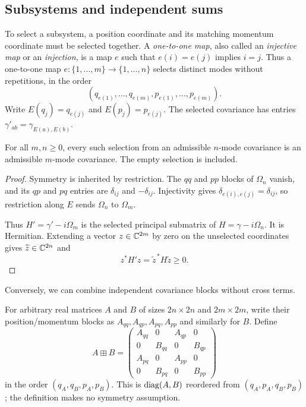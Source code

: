 \subsection{Subsystems and independent sums}
To select a subsystem, a position coordinate and its matching momentum
coordinate must be selected together. A \emph{one-to-one map}, also called an
\emph{injective map} or an \emph{injection}, is a map $e$ such that
$e(i)=e(j)$ implies $i=j$. Thus a one-to-one map
$e:\{1,\ldots,m\}\to\{1,\ldots,n\}$ selects distinct modes without
repetitions, in the order
\[
 (q_{e(1)},\ldots,q_{e(m)},p_{e(1)},\ldots,p_{e(m)}).
\]
Write $E(q_j)=q_{e(j)}$ and $E(p_j)=p_{e(j)}$. The selected covariance has
entries $\gamma'_{ab}=\gamma_{E(a),E(b)}$.

\begin{theorem}\label{thm:subsystem}
For all $m,n\geq0$, every such selection from an admissible $n$-mode covariance
is an admissible $m$-mode covariance. The empty selection is included.
\end{theorem}
\begin{proof}
Symmetry is inherited by restriction. The $qq$ and $pp$ blocks of $\Omega_n$
vanish, and its $qp$ and $pq$ entries are $\delta_{ij}$ and $-\delta_{ij}$.
Injectivity gives $\delta_{e(i),e(j)}=\delta_{ij}$, so restriction along $E$
sends $\Omega_n$ to $\Omega_m$.

Thus $H'=\gamma'-i\Omega_m$ is the selected principal submatrix of
$H=\gamma-i\Omega_n$. It is Hermitian. Extending a vector $z\in\mathbb C^{2m}$
by zero on the unselected coordinates gives $\widetilde z\in\mathbb C^{2n}$ and
\[
 z^*H'z=\widetilde z^{\,*}H\widetilde z\geq0.
\]
\end{proof}

Conversely, we can combine independent covariance blocks without cross terms.
\begin{definition}\label{def:independent-sum}
For arbitrary real matrices $A$ and $B$ of sizes $2n\times2n$ and
$2m\times2m$, write their position/momentum blocks as $A_{qq},A_{qp},A_{pq},A_{pp}$
and similarly for $B$. Define
\begin{equation}\label{eq:independent-sum}
 A\boxplus B=
 \begin{pmatrix}
 A_{qq}&0&A_{qp}&0\\
 0&B_{qq}&0&B_{qp}\\
 A_{pq}&0&A_{pp}&0\\
 0&B_{pq}&0&B_{pp}
 \end{pmatrix}
\end{equation}
in the order $(q_A,q_B,p_A,p_B)$. This is $\operatorname{diag}(A,B)$ reordered from
$(q_A,p_A,q_B,p_B)$; the definition makes no symmetry assumption.
\end{definition}

